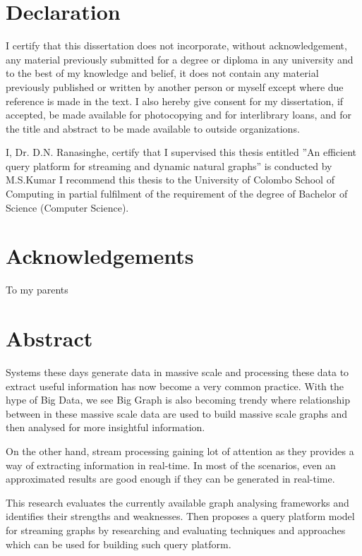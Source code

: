 \documentclass[12pt]{report}
\numberwithin{figure}{section}
\numberwithin{table}{section}
\begin{document}
\section*{Declaration}
%

I certify that this dissertation does not incorporate, without acknowledgement, any material previously submitted for a degree or diploma in any university and to the best of my knowledge and belief, it does not contain any material previously published or written by another person or myself except where due reference is made in the text. I also hereby give consent for my dissertation, if accepted, be made available for photocopying and for interlibrary loans, and for the title and abstract to be made available to outside organizations.



I, Dr. D.N. Ranasinghe, certify that I supervised this thesis entitled ”An efficient query platform for streaming and dynamic natural graphs” is conducted by M.S.Kumar I recommend this thesis to the University of Colombo School of Computing in partial fulfilment of the requirement of the degree of Bachelor of Science (Computer Science).

\newpage

\section*{Acknowledgements}
%
To my parents
\newpage


\section*{Abstract}
%

Systems these days generate data in massive scale and processing these data to extract useful information has now become a very common practice. With the hype of Big Data, we see Big Graph is also becoming trendy where relationship between in these massive scale data are used to build massive scale graphs and then analysed for more insightful information.

On the other hand, stream processing gaining lot of attention as they provides a way of extracting information in real-time. In most of the scenarios, even an approximated results are good enough if they can be generated in real-time.

This research evaluates the currently available graph analysing frameworks and identifies their strengths and weaknesses. Then proposes a query platform model for streaming graphs by researching and evaluating techniques and approaches which can be used for building such query platform. 
\end{document}
